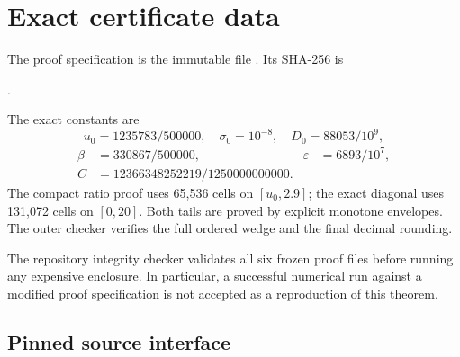 \section{Exact certificate data}\label{app:upper-certificate}

The proof specification is the immutable file
.  Its SHA-256 is
\begin{center}
.
\end{center}
The exact constants are
\[
 u_0=1235783/500000,\quad
 \sigma_0=10^{-8},\quad D_0=88053/10^9,
\]
\[
\begin{aligned}
 \beta&=330867/500000,&
 \varepsilon&=6893/10^7,\\
 C&=12366348252219/1250000000000.
\end{aligned}
\]
The compact ratio proof uses 65,536 cells on \([u_0,2.9]\); the exact
diagonal uses 131,072 cells on \([0,20]\).  Both tails are proved by explicit
monotone envelopes.  The outer checker verifies the full ordered wedge and
the final decimal rounding.

The repository integrity checker validates all six frozen proof files before
running any expensive enclosure.  In particular, a successful numerical run
against a modified proof specification is not accepted as a reproduction of
this theorem.

\subsection{Pinned source interface}

